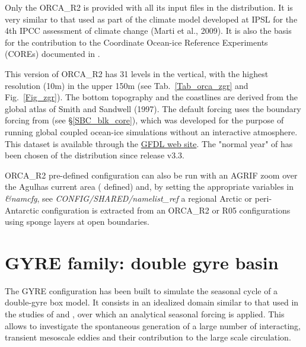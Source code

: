 \documentclass[NEMO_book]{subfiles}
\begin{document}
Only the ORCA\_R2 is provided with all its input files in the \NEMO distribution. 
It is very similar to that used as part of the climate model developed at IPSL for the 4th IPCC 
assessment of climate change (Marti et al., 2009). It is also the basis for the \NEMO contribution 
to the Coordinate Ocean-ice Reference Experiments (COREs) documented in \citet{Griffies_al_OM09}. 

This version of ORCA\_R2 has 31 levels in the vertical, with the highest resolution (10m) 
in the upper 150m (see Tab.~\ref{Tab_orca_zgr} and Fig.~\ref{Fig_zgr}). 
The bottom topography and the coastlines are derived from the global atlas of Smith and Sandwell (1997). 
The default forcing uses the boundary forcing from \citet{Large_Yeager_Rep04} (see \S\ref{SBC_blk_core}), 
which was developed for the purpose of running global coupled ocean-ice simulations 
without an interactive atmosphere. This \citet{Large_Yeager_Rep04} dataset is available 
through the \href{http://nomads.gfdl.noaa.gov/nomads/forms/mom4/CORE.html}{GFDL web site}. 
The "normal year" of \citet{Large_Yeager_Rep04} has been chosen of the \NEMO distribution 
since release v3.3. 

ORCA\_R2 pre-defined configuration can also be run with an AGRIF zoom over the Agulhas 
current area (   defined) and,  by setting the appropriate variables in 
\textit{\&namcfg}, see \textit{CONFIG/SHARED/namelist\_ref}
a regional Arctic or peri-Antarctic configuration is extracted from an ORCA\_R2 or R05 configurations
using sponge layers at open boundaries. 

\section{GYRE family: double gyre basin }
\label{CFG_gyre}

The GYRE configuration \citep{Levy_al_OM10} has been built to simulate
the seasonal cycle of a double-gyre box model. It consists in an idealized domain 
similar to that used in the studies of \citet{Drijfhout_JPO94} and \citet{Hazeleger_Drijfhout_JPO98, 
Hazeleger_Drijfhout_JPO99, Hazeleger_Drijfhout_JGR00, Hazeleger_Drijfhout_JPO00}, 
over which an analytical seasonal forcing is applied. This allows to investigate the 
spontaneous generation of a large number of interacting, transient mesoscale eddies 
and their contribution to the large scale circulation. 
\end{document}
